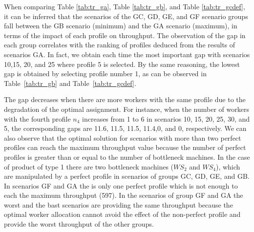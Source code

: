 \documentclass[review,12pt, 3p, times]{elsarticle}
\begin{document}
When comparing Table \ref{tab:tr_ga}, Table \ref{tab:tr_gb}, and Table \ref{tab:tr_gcdef}, it can be inferred that the scenarios of the GC, GD, GE, and GF scenario groups fall between the GB scenario (minimum) and the GA scenario (maximum), in terms of the impact of each profile on throughput.
The observation of the gap in each group correlates with the ranking of profiles deduced from the results of scenarios GA. In fact, we obtain each time the most important gap with scenarios 10,15, 20, and 25 where profile 5 is selected. By the same reasoning, the lowest gap is obtained by selecting profile number 1, as can be observed in Table~\ref{tab:tr_gb} and Table~\ref{tab:tr_gcdef}.    
			
The gap decreases when there are more workers with the same profile due to the degradation of the optimal assignment. For instance, when the number of workers with the fourth profile $n_4$ increases from 1 to 6 in scenarios 10, 15, 20, 25, 30, and 5, the corresponding gaps are 11.6, 11.5, 11.5, 11.4,0, and 0, respectively.
We can also observe that the optimal solution for scenarios with more than two perfect profiles can reach the maximum throughput value because the number of perfect profiles is greater than or equal to the number of bottleneck machines. In the case of product of type 1 there are two bottleneck machines ($WS_2$ and $WS_4$), which are manipulated by a perfect profile in scenarios of groups GC, GD, GE, and GB. In scenarios GF and GA the is only one perfect profile which is not enough to each the maximum throughput (597). In the scenarios of group GF and GA the worst and the bast scenarios are providing the same throughput because the optimal worker allocation cannot avoid the effect of the non-perfect profile and provide the worst throughput of the other groups.
	
\end{document}
